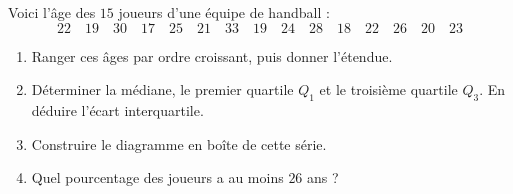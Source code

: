 
\newcommand{\R}{\mathbb{R}}
\newcommand{\vect}[1]{\overrightarrow{#1}}

Voici l'âge des $15$ joueurs d'une équipe de handball :
\[22\quad19\quad30\quad17\quad25\quad21\quad33\quad19\quad24\quad28\quad18\quad22\quad26\quad20\quad23\]
\begin{enumerate}
  \item Ranger ces âges par ordre croissant, puis donner l'étendue.
  \item Déterminer la médiane, le premier quartile $Q_1$ et le troisième quartile $Q_3$. En déduire l'écart interquartile.
  \item Construire le diagramme en boîte de cette série.
  \item Quel pourcentage des joueurs a au moins $26$ ans ?
\end{enumerate}

